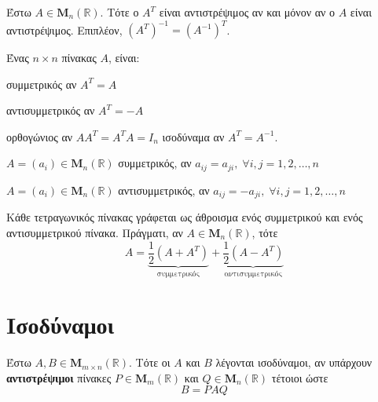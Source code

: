 \begin{thm}
  Έστω $ A \in \textbf{M}_{n}(\mathbb{R}) $. Τότε ο $ A^{T} $ είναι αντιστρέψιμος 
  αν και μόνον αν ο $A$ είναι αντιστρέψιμος. Επιπλέον, $ (A^{T})^{-1}=(A^{-1})^{T} $.
\end{thm}

\begin{dfn}
  Ένας $ n \times n $ πίνακας $A$, είναι:
  \begin{myitemize}
    \item συμμετρικός αν $ A^{T}=A  $
    \item αντισυμμετρικός αν $ A^{T}=-A  $
    \item ορθογώνιος αν $ AA^{T}=A^{T}A = I_{n} $ ισοδύναμα αν $ A^{T}=A^{-1} $.
  \end{myitemize}
\end{dfn}

\begin{rem}
\item {}
  \begin{myitemize}
    \item $ A=(a_{i}) \in \textbf{M}_{n}(\mathbb{R}) $ συμμετρικός, αν $ a_{ij} = a_{ji},
      \; \forall i,j=1,2,\ldots, n $ 
    \item $ A=(a_{i}) \in \textbf{M}_{n}(\mathbb{R}) $ αντισυμμετρικός, αν $ a_{ij} =
      -a_{ji}, \; \forall i,j=1,2,\ldots, n $ 
  \end{myitemize}
\end{rem}

\begin{prop}
\item {}
  \begin{myitemize}
    \item  Κάθε τετραγωνικός πίνακας γράφεται ως άθροισμα ενός συμμετρικού και ενός 
      αντισυμμετρικού πίνακα. Πράγματι, αν $ A \in \textbf{M}_{n}(\mathbb{R}) $, τότε
  \[
    A = \underbrace{\frac{1}{2} \left(A+A^{T}\right)}_{\text{συμμετρικός}} +
  \underbrace{\frac{1}{2} \left(A-A^{T}\right)}_{\text{αντισυμμετρικός}} 
\]
\end{myitemize}
\end{prop}

\section*{Ισοδύναμοι}
 
\begin{dfn}
  Έστω $ A,B \in \textbf{M}_{m \times n}(\mathbb{R}) $. Τότε οι $ A $ και $ B $ 
  λέγονται \textcolor{Col1}{ισοδύναμοι}, αν υπάρχουν \textbf{αντιστρέψιμοι} πίνακες 
  $ P \in \textbf{M}_{m}(\mathbb{R}) $ και $ Q \in \textbf{M}_{n}(\mathbb{R}) $ τέτοιοι 
  ώστε
  \[
     B = PAQ 
   \] 
\end{dfn}

